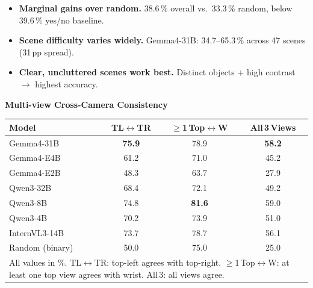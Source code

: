 {\begin{itemize}
  \item \textbf{Marginal gains over random.} 38.6\,\% overall vs.\ 33.3\,\% random, below 39.6\,\% yes/no baseline.
  \item \textbf{Scene difficulty varies widely.} Gemma4-31B: 34.7--65.3\,\% across 47 scenes (31\,pp spread).
  \item \textbf{Clear, uncluttered scenes work best.} Distinct objects + high contrast $\rightarrow$ highest accuracy.
\end{itemize}

\vspace{14pt}

\noindent\textbf{Multi-view Cross-Camera Consistency}

\vspace{6pt}

\begin{center}
{\large
\begin{tabular}{l|@{\hskip 14pt}ccc}
\hline
\textbf{Model} & \textbf{TL$\leftrightarrow$TR} & \textbf{$\geq$1\,Top$\leftrightarrow$W} & \textbf{All\,3\,Views} \\
\hline
Gemma4-31B      & \textbf{75.9} & 78.9          & \textbf{58.2} \\
Gemma4-E4B      & 61.2          & 71.0          & 45.2 \\
Gemma4-E2B      & 48.3          & 63.7          & 27.9 \\
Qwen3-32B       & 68.4          & 72.1          & 49.2 \\
Qwen3-8B        & 74.8          & \textbf{81.6} & 59.0 \\
Qwen3-4B        & 70.2          & 73.9          & 51.0 \\
InternVL3-14B   & 73.7          & 78.7          & 56.1 \\
\hline
Random (binary) & 50.0 & 75.0 & 25.0 \\
\hline
\multicolumn{4}{l}{\scriptsize All values in \%. TL$\leftrightarrow$TR: top-left agrees with top-right. $\geq$1\,Top$\leftrightarrow$W: at least one top view agrees with wrist. All\,3: all views agree.}\\
\end{tabular}
}
\end{center}

}
